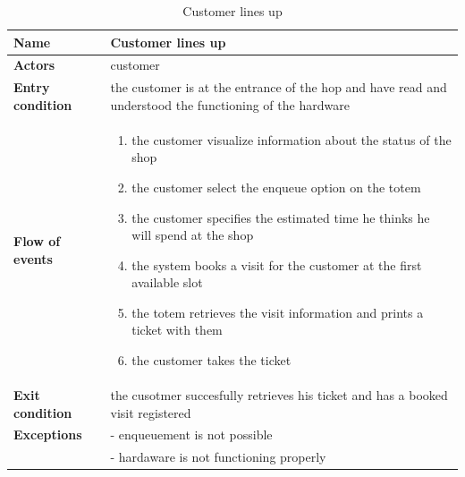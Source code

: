 \begin{table}[h!]
    \centering
    \begin{tabular}{@{}P{0.2\textwidth}P{0.70\textwidth}@{}}
        \toprule
        \textbf{Name}                 & Customer lines up\\
        \midrule
        \textbf{Actors}               & customer\\
        \textbf{Entry condition}      & the customer is at the entrance of the hop and have read and understood the functioning of the hardware\\
        \textbf{Flow of events}       & 
        \begin{enumerate}[nolistsep, leftmargin=*]
            \item the customer visualize information about the status of the shop
            \item the customer select the enqueue option on the totem
            \item the customer specifies the estimated time he thinks he will spend at the shop
            \item the system books a visit for the customer at the first available slot
            \item the totem retrieves the visit information and prints a ticket with them
            \item the customer takes the ticket
        \end{enumerate} \\
        \textbf{Exit condition}       & the cusotmer succesfully retrieves his ticket and has a booked visit registered\\
        \textbf{Exceptions}           
        & - enqueuement is not possible\\
        & - hardaware is not functioning properly\\
        \bottomrule
    \end{tabular}
\caption{Customer lines up}
\label{table:customerlinesup}
\end{table}

